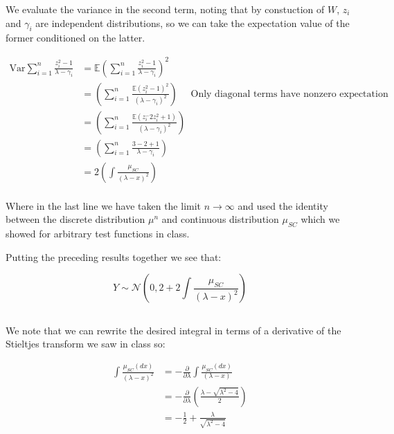 \documentclass{article}
\begin{document}
We evaluate the variance in the second term, noting that by constuction of $W$, $z_i$ and $\gamma_i$ are independent distributions, so we can take the expectation value of the former conditioned on the latter.  


\begin{equation}
\begin{split}
	\text{Var} \sum^{n}_{i=1}\frac{z_i^2 - 1}{\lambda-\gamma_i} 
	&= \mathbb{E} \left(  \sum^{n}_{i=1}\frac{z_i^2 - 1}{\lambda-\gamma_i}  \right)^2 \\
	&=  \left(  \sum^{n}_{i=1}\frac{\mathbb{E}\left(z_i^2 - 1\right)^2}{ \left( \lambda-\gamma_i \right)^2}  \right) \quad \text{ Only diagonal terms have nonzero expectation }\\
	&= \left(  \sum^{n}_{i=1}\frac{\mathbb{E}\left(z_i^ -2z_i^2 +1\right)}{ \left( \lambda-\gamma_i \right)^2}  \right) \\
	&= \left(  \sum^{n}_{i=1}\frac{3 - 2 + 1}{\lambda-\gamma_i}  \right) \\
	&= 2\left(  \int \frac{\mu_{SC}}{\left( \lambda-x \right)^2} \right) \\
\end{split}
\end{equation}

Where in the last line we have taken the limit $n\rightarrow\infty$ and used the identity between the discrete distribution $\mu^{n}$ and continuous distribution $\mu_{SC}$ which we showed for arbitrary test functions in class.

Putting the preceding results together we see that:

\begin{equation}
	Y\sim \mathcal{N} \left( 0, 2 +2\int \frac{\mu_{SC}}{\left( \lambda-x \right)^2}    \right)
\end{equation}

\subsection{}%


We note that we can rewrite the desired integral in terms of a derivative of the Stieltjes transform we saw in class so:

\begin{equation}
\begin{split}
 \int \frac{\mu_{SC}\left( dx \right)}{\left( \lambda -x \right)^2} &= - \frac{\partial}{\partial \lambda} \int \frac{\mu_{SC}\left( dx \right)}{\left( \lambda -x \right)} \\
								    &=  - \frac{\partial}{\partial \lambda} \left( \frac{\lambda - \sqrt{\lambda^2-4}}{2} \right) \\
								    &= - \frac{1}{2}  + \frac{\lambda}{\sqrt{\lambda^2-4}} 
\end{split}
\end{equation}
\end{document}
